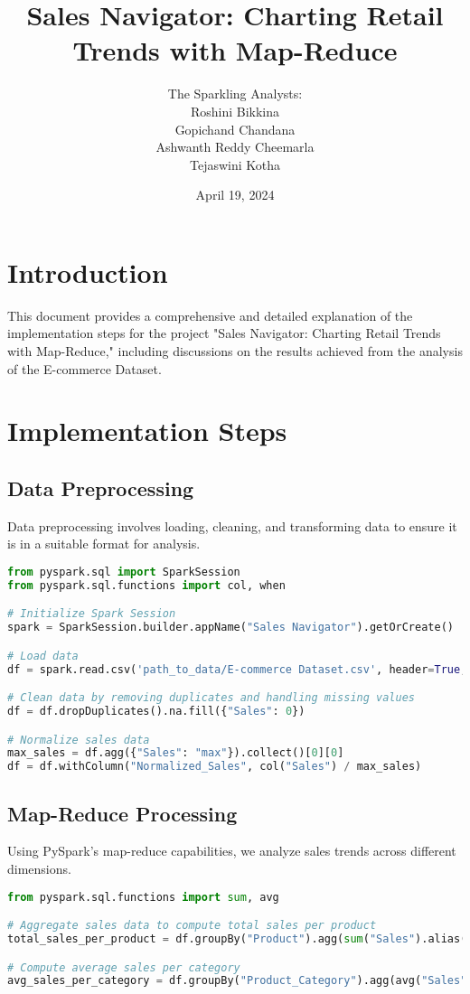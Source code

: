 \documentclass{article}
\title{Sales Navigator: Charting Retail Trends with Map-Reduce}
\author{The Sparkling Analysts:\\ Roshini Bikkina \\ Gopichand Chandana \\ Ashwanth Reddy Cheemarla \\ Tejaswini Kotha}
\date{April 19, 2024}
\begin{document}
\maketitle

\section{Introduction}
This document provides a comprehensive and detailed explanation of the implementation steps for the project "Sales Navigator: Charting Retail Trends with Map-Reduce," including discussions on the results achieved from the analysis of the E-commerce Dataset.

\section{Implementation Steps}
\subsection{Data Preprocessing}
Data preprocessing involves loading, cleaning, and transforming data to ensure it is in a suitable format for analysis.
\begin{lstlisting}[language=Python]
from pyspark.sql import SparkSession
from pyspark.sql.functions import col, when

# Initialize Spark Session
spark = SparkSession.builder.appName("Sales Navigator").getOrCreate()

# Load data
df = spark.read.csv('path_to_data/E-commerce Dataset.csv', header=True, inferSchema=True)

# Clean data by removing duplicates and handling missing values
df = df.dropDuplicates().na.fill({"Sales": 0})

# Normalize sales data
max_sales = df.agg({"Sales": "max"}).collect()[0][0]
df = df.withColumn("Normalized_Sales", col("Sales") / max_sales)
\end{lstlisting}

\subsection{Map-Reduce Processing}
Using PySpark's map-reduce capabilities, we analyze sales trends across different dimensions.
\begin{lstlisting}[language=Python]
from pyspark.sql.functions import sum, avg

# Aggregate sales data to compute total sales per product
total_sales_per_product = df.groupBy("Product").agg(sum("Sales").alias("Total_Sales"))

# Compute average sales per category
avg_sales_per_category = df.groupBy("Product_Category").agg(avg("Sales").alias("Average_Sales"))
\end{lstlisting}
\end{document}
